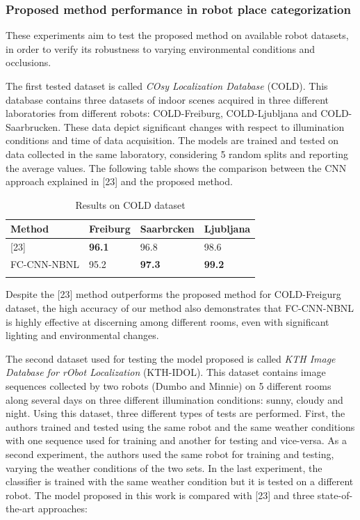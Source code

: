 \subsubsection{Proposed method performance in robot place
categorization}\label{header-n767}

These experiments aim to test the proposed method on available robot
datasets, in order to verify its robustness to varying environmental
conditions and occlusions.

The first tested dataset is called \emph{COsy Localization Database}
(COLD). This database contains three datasets of indoor scenes acquired
in three different laboratories from different robots: COLD-Freiburg,
COLD-Ljubljana and COLD-Saarbrucken. These data depict significant
changes with respect to illumination conditions and time of data
acquisition. The models are trained and tested on data collected in the
same laboratory, considering 5 random splits and reporting the average
values. The following table shows the comparison between the CNN
approach explained in {[}23{]} and the proposed method.

\begin{longtable}[]{@{}llll@{}}
\toprule
\textbf{Method} & \textbf{Freiburg} & \textbf{Saarbrcken} &
\textbf{Ljubljana}\tabularnewline
\midrule
\endhead
{[}23{]} & \textbf{96.1} & 96.8 & 98.6\tabularnewline
FC-CNN-NBNL & 95.2 & \textbf{97.3} & \textbf{99.2}\tabularnewline
\bottomrule
\caption{Results on COLD dataset}
\end{longtable}

Despite the {[}23{]} method outperforms the proposed method for
COLD-Freigurg dataset, the high accuracy of our method also demonstrates
that FC-CNN-NBNL is highly effective at discerning among different
rooms, even with significant lighting and environmental changes.

The second dataset used for testing the model proposed is called
\emph{KTH Image Database for rObot Localization} (KTH-IDOL). This
dataset contains image sequences collected by two robots (Dumbo and
Minnie) on 5 different rooms along several days on three different
illumination conditions: sunny, cloudy and night. Using this dataset,
three different types of tests are performed. First, the authors trained
and tested using the same robot and the same weather conditions with one
sequence used for training and another for testing and vice-versa. As a
second experiment, the authors used the same robot for training and
testing, varying the weather conditions of the two sets. In the last
experiment, the classifier is trained with the same weather condition
but it is tested on a different robot. The model proposed in this work
is compared with {[}23{]} and three state-of-the-art approaches:

